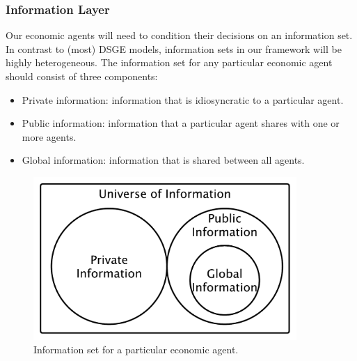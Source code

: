 \documentclass[11pt]{amsart}
\begin{document}



\subsubsection{Information Layer}
Our economic agents will need to condition their decisions on an information set.  In contrast to (most) DSGE models, information sets in our framework will be highly heterogeneous. The information set for any particular economic agent should consist of three components:
\begin{itemize}
    \item Private information: information that is idiosyncratic to a particular agent. 
    \item Public information: information that a particular agent shares with one or more agents.
    \item Global information: information that is shared between all agents.
\end{itemize}
\begin{figure}[H]
\centering
\includegraphics[width=10cm]{img/information-sets.pdf}
\caption{Information set for a particular economic agent.}
\end{figure}
\end{document}
